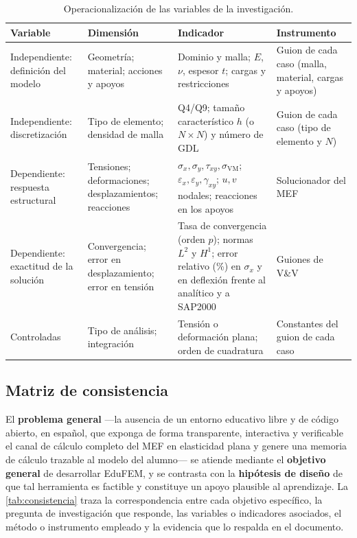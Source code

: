 \begin{table}[htbp]
\centering
\caption{Operacionalización de las variables de la investigación.}
\label{tab:variables}
\begin{tabular}{@{}p{2.7cm}p{3.2cm}p{5.1cm}p{2.5cm}@{}}
\toprule
\textbf{Variable} & \textbf{Dimensión} & \textbf{Indicador} & \textbf{Instrumento} \\
\midrule
Independiente: definición del modelo & Geometría; material; acciones y apoyos & Dominio y malla; $E$, $\nu$, espesor $t$; cargas y restricciones & Guion de cada caso (malla, material, cargas y apoyos) \\
Independiente: discretización & Tipo de elemento; densidad de malla & Q4/Q9; tamaño característico $h$ (o $N\times N$) y número de GDL & Guion de cada caso (tipo de elemento y $N$) \\
Dependiente: respuesta estructural & Tensiones; deformaciones; desplazamientos; reacciones & $\sigma_x,\sigma_y,\tau_{xy},\sigma_{\mathrm{VM}}$; $\varepsilon_x,\varepsilon_y,\gamma_{xy}$; $u,v$ nodales; reacciones en los apoyos & Solucionador del MEF \\
Dependiente: exactitud de la solución & Convergencia; error en desplazamiento; error en tensión & Tasa de convergencia (orden $p$); normas $L^2$ y $H^1$; error relativo (\%) en $\sigma_x$ y en deflexión frente al analítico y a SAP2000 & Guiones de V\&V \\
Controladas & Tipo de análisis; integración & Tensión o deformación plana; orden de cuadratura & Constantes del guion de cada caso \\
\bottomrule
\end{tabular}
\end{table}

\subsection{Matriz de consistencia}
\label{sec:matriz-consistencia}

El \textbf{problema general} —la ausencia de un entorno educativo libre y de código abierto, en español, que exponga de forma transparente, interactiva y verificable el canal de cálculo completo del MEF en elasticidad plana y genere una memoria de cálculo trazable al modelo del alumno— se atiende mediante el \textbf{objetivo general} de desarrollar EduFEM, y se contrasta con la \textbf{hipótesis de diseño} de que tal herramienta es factible y constituye un apoyo plausible al aprendizaje. La \autoref{tab:consistencia} traza la correspondencia entre cada objetivo específico, la pregunta de investigación que responde, las variables o indicadores asociados, el método o instrumento empleado y la evidencia que lo respalda en el documento.

